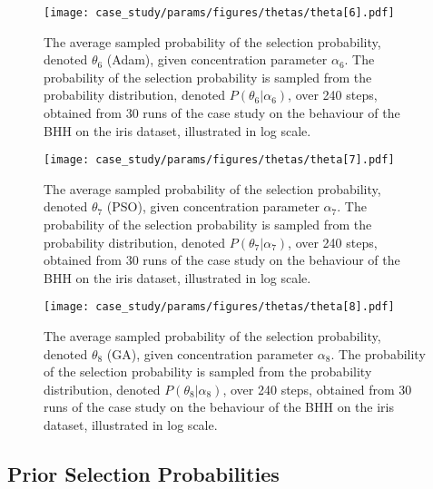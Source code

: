 \begin{figure}[htpb]
	\centering
	\texttt{[image: case\_study/params/figures/thetas/theta[6].pdf]}
	\caption{The average sampled probability of the selection probability, denoted $\theta_{6}$ (\acs{Adam}), given concentration parameter $\alpha_{6}$. The probability of the selection probability is sampled from the probability distribution, denoted $P(\theta_{6} \vert \alpha_{6})$, over 240 steps, obtained from 30 runs of the case study on the behaviour of the \acs{BHH} on the iris dataset, illustrated in log scale.}
	\label{fig:results:case_study:theta:6}
\end{figure}

\begin{figure}[htpb]
	\centering
	\texttt{[image: case\_study/params/figures/thetas/theta[7].pdf]}
	\caption{The average sampled probability of the selection probability, denoted $\theta_{7}$ (\acs{PSO}), given concentration parameter $\alpha_{7}$. The probability of the selection probability is sampled from the probability distribution, denoted $P(\theta_{7} \vert \alpha_{7})$, over 240 steps, obtained from 30 runs of the case study on the behaviour of the \acs{BHH} on the iris dataset, illustrated in log scale.}
	\label{fig:results:case_study:theta:7}
\end{figure}

\begin{figure}[htpb]
	\centering
	\texttt{[image: case\_study/params/figures/thetas/theta[8].pdf]}
	\caption{The average sampled probability of the selection probability, denoted $\theta_{8}$ (\acs{GA}), given concentration parameter $\alpha_{8}$. The probability of the selection probability is sampled from the probability distribution, denoted $P(\theta_{8} \vert \alpha_{8})$, over 240 steps, obtained from 30 runs of the case study on the behaviour of the \acs{BHH} on the iris dataset, illustrated in log scale.}
	\label{fig:results:case_study:theta:8}
\end{figure}


\subsection{Prior Selection Probabilities}\label{sec:results:case_study:prior_selec_prob}

